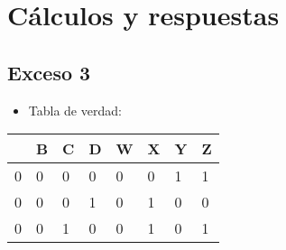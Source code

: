 \section{Cálculos y respuestas}
\subsection{Exceso 3}
\begin{itemize} \item Tabla de verdad: \end{itemize}

\begin{center}
\begin{tabular}{|llll|llll|}
\hline
\rowcolor[HTML]{FFCE93} 
\multicolumn{1}{|c}{\cellcolor[HTML]{FFCE93}\textbf{A}} & \multicolumn{1}{c}{\cellcolor[HTML]{FFCE93}\textbf{B}} & \multicolumn{1}{c}{\cellcolor[HTML]{FFCE93}\textbf{C}} & \multicolumn{1}{c|}{\cellcolor[HTML]{FFCE93}\textbf{D}} & \multicolumn{1}{c}{\cellcolor[HTML]{FFCE93}\textbf{W}} & \multicolumn{1}{c}{\cellcolor[HTML]{FFCE93}\textbf{X}} & \multicolumn{1}{c}{\cellcolor[HTML]{FFCE93}\textbf{Y}} & \multicolumn{1}{c|}{\cellcolor[HTML]{FFCE93}\textbf{Z}} \\ \hline
0                                                       & 0                                                      & 0                                                      & 0                                                       & 0                                                      & 0                                                      & 1                                                      & 1                                                       \\
0                                                       & 0                                                      & 0                                                      & 1                                                       & 0                                                      & 1                                                      & 0                                                      & 0                                                       \\
0                                                       & 0                                                      & 1                                                      & 0                                                       & 0                                                      & 1                                                      & 0                                                      & 1                                                       \\

\end{tabular}
\end{center}

